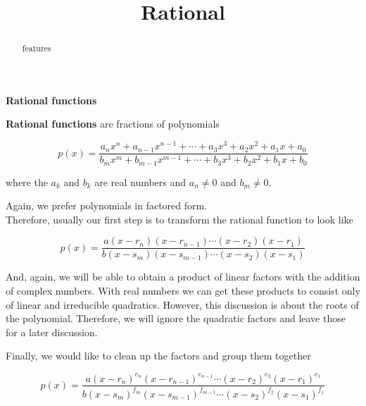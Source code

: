 \documentclass{ximera}
\title{Rational}
\begin{document}
\begin{abstract}
features
\end{abstract}
\maketitle








\begin{definition} \item \textbf{\textcolor{green!50!black}{Rational functions}}


\textbf{Rational functions} are fractions of polynomials




\[ p(x) =   \frac{ a_n x^n + a_{n-1} x^{n-1} + \cdots + a_3 x^3 + a_2 x^2 + a_1 x + a_0  } { b_m x^m + b_{m-1} x^{m-1} + \cdots + b_3 x^3 + b_2 x^2 + b_1 x + b_0 }   \]



where the $a_k$ and $b_k$ are real numbers and $a_n \ne 0$ and $b_m \ne 0$.


\end{definition}





Again, we prefer polynomials in factored form.  \\


Therefore, usually our first step is to transform the rational function to look like



\[ p(x) =   \frac{ a (x-r_n)(x-r_{n-1})  \cdots (x-r_2)(x-r_1)  } { b (x-s_m)(x-s_{m-1})  \cdots (x-s_2)(x-s_1) }   \]




And, again, we will be able to obtain a product of linear factors with the addition of complex numbers.  With real numbers we can get these products to consist only of linear and irreducible quadratics. However, this discussion is about the roots of the polynomial.  Therefore, we will ignore the quadratic factors and leave those for a later discussion.




Finally, we would like to clean up the factors and group them together






\[ p(x) =   \frac{ a (x-r_n)^{e_n} (x-r_{n-1})^{e_{n-1}}  \cdots (x-r_2)^{e_2} (x-r_1)^{e_1}  } { b (x-s_m)^{f_m} (x-s_{m-1})^{f_{m-1}}  \cdots (x-s_2)^{f_2} (x-s_1)^{f_1} }   \]
\end{document}
